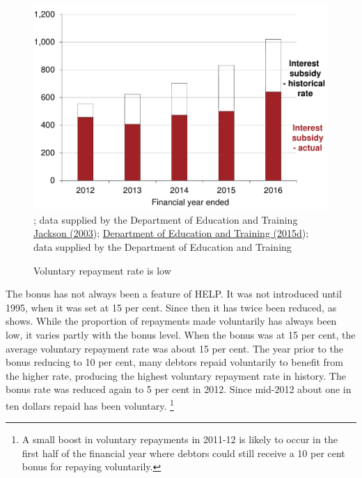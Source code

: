 \documentclass[embargoed]{grattan}
\begin{document}
\begin{figure}
\caption{Voluntary repayment rate is low}\label{fig:fig8-voluntary-repayment-rate-is-low}

\includegraphics[page=8]{atlas/Chartpack.pdf}
{\textcites{Jackson2003TheHigherEducationContributionScheme}{Education2015Highereducationreport}; data supplied by the Department of Education and Training}
{\protect\hyperlink{_ENREF_50}{Jackson (2003}); \protect\hyperlink{_ENREF_27}{Department of Education and Training (2015d}); data supplied by the Department of Education and Training}
\end{figure}

The bonus has not always been a feature of \gls{HELP}.
It was not introduced until 1995, when it was set at 15 per cent.
Since then it has twice been reduced, as  shows.
While the proportion of repayments made voluntarily has always been low, it varies partly with the bonus level.
When the bonus was at 15 per cent, the average voluntary repayment rate was about 15 per cent.
The year prior to the bonus reducing to 10 per cent, many debtors repaid voluntarily to benefit from the higher rate, producing the highest voluntary repayment rate in history.
The bonus rate was reduced again to 5 per cent in 2012.
Since mid-2012 about one in ten dollars repaid has been voluntary.%
\footnote{A small boost in voluntary repayments in 2011-12 is likely to occur in the first half of the financial year where debtors could still receive a 10 per cent bonus for repaying voluntarily.}
\end{document}
